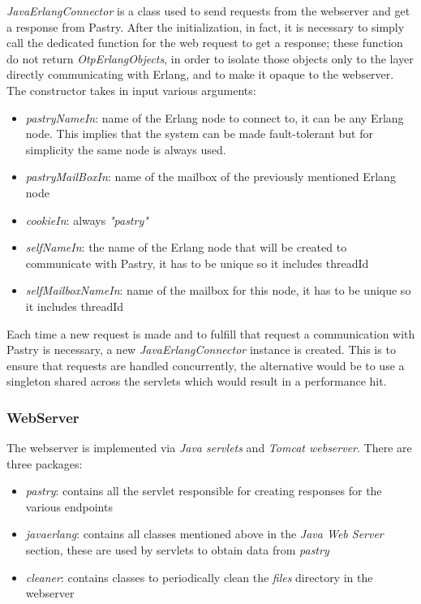 \documentclass{article}
\begin{document}
\textit{JavaErlangConnector} is a class used to send requests from the webserver and get a response from Pastry.
After the initialization, in fact, it is necessary to simply call the dedicated function for the web request to get a 
response; these function do not return \textit{OtpErlangObjects}, in order to isolate those objects only to the layer 
directly communicating with Erlang, and to make it opaque to the webserver.
\newline
The constructor takes in input various arguments:
\begin{itemize}
    \item \textit{pastryNameIn}: name of the Erlang node to connect to, it can be any Erlang node. This implies that the system can be made fault-tolerant but for simplicity the same node is always used.
    \item \textit{pastryMailBoxIn}: name of the mailbox of the previously mentioned Erlang node
    \item \textit{cookieIn}: always \textit{"pastry"}
    \item \textit{selfNameIn}: the name of the Erlang node that will be created to communicate with Pastry, it has to be unique so it includes threadId
    \item \textit{selfMailboxNameIn}: name of the mailbox for this node, it has to be unique so it includes threadId
\end{itemize}
Each time a new request is made and to fulfill that request a communication with Pastry is necessary, a new \textit{JavaErlangConnector} instance is created. This is to ensure that requests are handled concurrently, the alternative would be to use a singleton shared across the servlets which would result in a performance hit. 

\subsubsection{WebServer}

The webserver is implemented via \textit{Java servlets} and \textit{Tomcat webserver}. There are three packages:

\begin{itemize}
    \item \textit{pastry}: contains all the servlet responsible for creating responses for the various endpoints
    \item \textit{javaerlang}: contains all classes mentioned above in the \textit{Java Web Server} section, these are used by servlets to obtain data from \textit{pastry}
    \item \textit{cleaner}: contains classes to periodically clean the \textit{files} directory in the webserver
\end{itemize}
\end{document}
